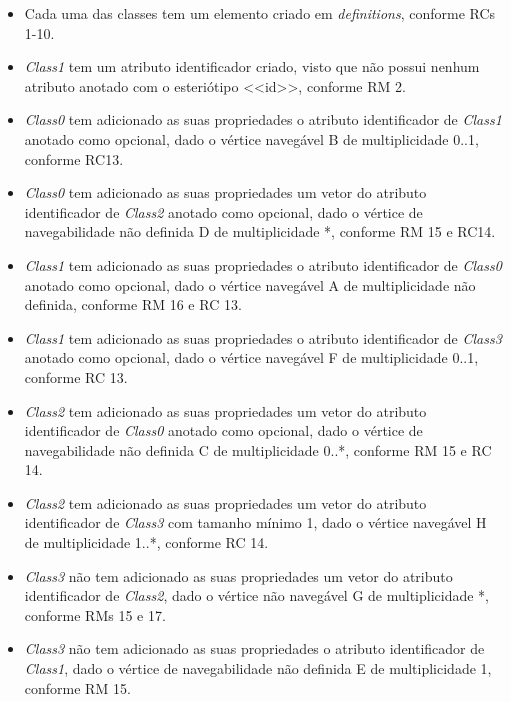 \begin{itemize}
    \item Cada uma das classes tem um elemento criado em \textit{definitions}, conforme RCs 1-10.
    
    \item \textit{Class1} tem um atributo identificador criado, visto que não possui nenhum atributo anotado com o esteriótipo <<id>>, conforme RM 2.
    
    \item \textit{Class0} tem adicionado as suas propriedades o atributo identificador de \textit{Class1} anotado como opcional, dado o vértice navegável B de multiplicidade 0..1, conforme RC13.
    
    \item \textit{Class0} tem adicionado as suas propriedades um vetor do atributo identificador de \textit{Class2} anotado como opcional, dado o vértice de navegabilidade não definida D de multiplicidade *, conforme RM 15 e RC14.
    
    \item \textit{Class1} tem adicionado as suas propriedades o atributo identificador de \textit{Class0} anotado como opcional, dado o vértice navegável A de multiplicidade não definida, conforme RM 16 e RC 13.
    
    \item \textit{Class1} tem adicionado as suas propriedades o atributo identificador de \textit{Class3} anotado como opcional, dado o vértice navegável F de multiplicidade 0..1, conforme RC 13.
    
    \item \textit{Class2} tem adicionado as suas propriedades um vetor do atributo identificador de \textit{Class0} anotado como opcional, dado o vértice de navegabilidade não definida C de multiplicidade 0..*, conforme RM 15 e RC 14.
    
    \item \textit{Class2} tem adicionado as suas propriedades um vetor do atributo identificador de \textit{Class3} com tamanho mínimo 1, dado o vértice navegável H de multiplicidade 1..*, conforme RC 14.
    
    \item \textit{Class3} não tem adicionado as suas propriedades um vetor do atributo identificador de \textit{Class2}, dado o vértice não navegável G de multiplicidade *, conforme RMs 15 e 17.
    
    \item \textit{Class3} não tem adicionado as suas propriedades o atributo identificador de \textit{Class1}, dado o vértice de navegabilidade não definida E de multiplicidade 1, conforme RM 15.
\end{itemize}

